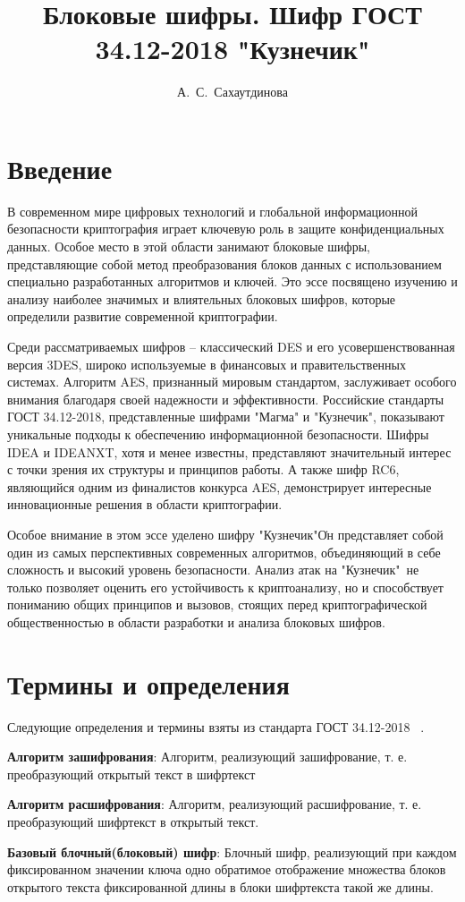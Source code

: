 \documentclass[colorthm]{../civarticle}
\title{
    Блоковые шифры. Шифр ГОСТ 34.12-2018 "Кузнечик"\\
}
\author{А.~С.~Сахаутдинова}
\begin{document}
\blindmathtrue
\section{Введение}
\label{sec:thm-pif}

В современном мире цифровых технологий и глобальной информационной безопасности криптография играет ключевую роль в защите конфиденциальных данных. Особое место в этой области занимают блоковые шифры, представляющие собой метод преобразования блоков данных с использованием специально разработанных алгоритмов и ключей. Это эссе посвящено изучению и анализу наиболее значимых и влиятельных блоковых шифров, которые определили развитие современной криптографии.

Среди рассматриваемых шифров – классический DES и его усовершенствованная версия 3DES, широко используемые в финансовых и правительственных системах. Алгоритм AES, признанный мировым стандартом, заслуживает особого внимания благодаря своей надежности и эффективности. Российские стандарты ГОСТ 34.12-2018, представленные шифрами "Магма" и "Кузнечик", показывают уникальные подходы к обеспечению информационной безопасности. Шифры IDEA и IDEANXT, хотя и менее известны, представляют значительный интерес с точки зрения их структуры и принципов работы. А также шифр RC6, являющийся одним из финалистов конкурса AES, демонстрирует интересные инновационные решения в области криптографии.

Особое внимание в этом эссе уделено шифру "Кузнечик"\. Он представляет собой один из самых перспективных современных алгоритмов, объединяющий в себе сложность и высокий уровень безопасности. Анализ атак на "Кузнечик"\ не только позволяет оценить его устойчивость к криптоанализу, но и способствует пониманию общих принципов и вызовов, стоящих перед криптографической общественностью в области разработки и анализа блоковых шифров.


\section{Термины и определения}
Следующие определения и термины взяты из стандарта ГОСТ 34.12-2018 ~\cite{gost2018}.

\textbf{Алгоритм зашифрования}: Алгоритм, реализующий зашифрование, т. е. преобразующий открытый текст в шифртекст

\textbf{Алгоритм расшифрования}: Алгоритм, реализующий расшифрование, т. е. преобразующий шифртекст в открытый текст.

\textbf{Базовый блочный(блоковый) шифр}: Блочный шифр, реализующий при каждом фиксированном значении ключа одно обратимое отображение множества блоков открытого текста фиксированной длины в блоки шифртекста такой же длины.
\end{document}
